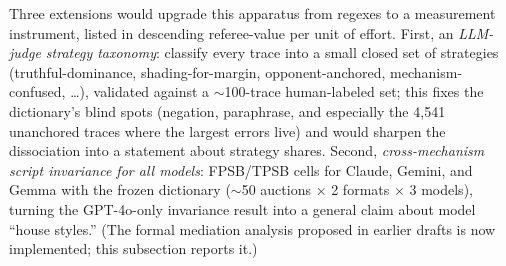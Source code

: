Three extensions would upgrade this apparatus from regexes to a measurement instrument, listed in descending referee-value per unit of effort. First, an \emph{LLM-judge strategy taxonomy}: classify every trace into a small closed set of strategies (truthful-dominance, shading-for-margin, opponent-anchored, mechanism-confused, \ldots), validated against a $\sim$100-trace human-labeled set; this fixes the dictionary's blind spots (negation, paraphrase, and especially the 4{,}541 unanchored traces where the largest errors live) and would sharpen the dissociation into a statement about strategy shares. Second, \emph{cross-mechanism script invariance for all models}: FPSB/TPSB cells for Claude, Gemini, and Gemma with the frozen dictionary ($\sim$50 auctions $\times$ 2 formats $\times$ 3 models), turning the GPT-4o-only invariance result into a general claim about model ``house styles.'' (The formal mediation analysis proposed in earlier drafts is now implemented; this subsection reports it.) 
